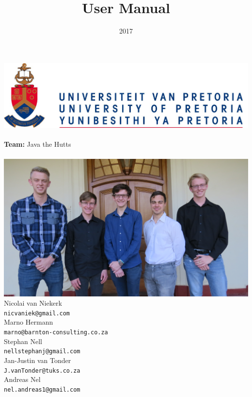 \documentclass{article}
\title{User Manual}
\date{2017}
\begin{document}
\makeatletter
    \begin{titlepage}
        \begin{center}
            \includegraphics[width=0.7\linewidth]{img/up.png}\\[4ex]
            {\huge \bfseries \@title }\\[2ex]
            {\LARGE \textbf{Team:} Java the Hutts}\\[2ex]
            {\LARGE \@date}\\[2ex]
            {\includegraphics[width=\linewidth]{img/team_photo.jpg}}\\[2ex]
            {\large  Nicolai van Niekerk\\ \texttt{nicvaniek@gmail.com}}\\[2ex]
            {\large  Marno Hermann\\ \texttt{marno@barnton-consulting.co.za}}\\[2ex]
            {\large  Stephan Nell\\ \texttt{nellstephanj@gmail.com}}\\[2ex]
            {\large  Jan-Justin van Tonder\\ \texttt{J.vanTonder@tuks.co.za}}\\[2ex]
            {\large  Andreas Nel\\ \texttt{nel.andreas1@gmail.com}}\\[2ex]
        \end{center}
        
    \end{titlepage}
\makeatother
\end{document}
